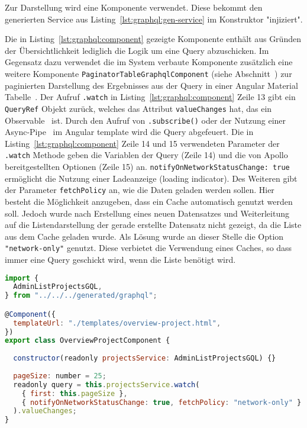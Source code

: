 Zur Darstellung wird eine Komponente verwendet. Diese bekommt den generierten Service aus Listing~\ref{lst:graphql:gen-service} im Konstruktor "injiziert". 

Die in Listing~\ref{lst:graphql:component} gezeigte Komponente enthält aus Gründen der Übersichtlichkeit lediglich die Logik um eine Query abzuschicken. Im Gegensatz dazu verwendet die im System verbaute Komponente zusätzlich eine weitere Komponente \texttt{PaginatorTableGraphql\-Component} (siehe Abschnitt~) zur paginierten Darstellung des Ergebnisses aus der Query in einer Angular Material Tabelle~\cite{angular-material-table}.
Der Aufruf \texttt{.watch} in Listing~\ref{lst:graphql:component} Zeile 13 gibt ein \texttt{QueryRef} Objekt zurück, welches das Attribut \texttt{valueChanges} hat, das ein Observable~\cite{angular-observable} ist.
Durch den Aufruf von \texttt{.subscribe()} \cite{angular-subscribe} oder der Nutzung einer Async-Pipe~\cite{angular-async-pipe} im Angular template wird die Query abgefeuert.
Die in Listing~\ref{lst:graphql:component} Zeile 14 und 15 verwendeten Parameter der \texttt{.watch} Methode geben die Variablen der Query (Zeile 14) und die von Apollo bereitgestellten Optionen (Zeile 15) an.
\texttt{notifyOnNetworkStatusChange: true} ermöglicht die Nutzung einer Ladeanzeige (loading indicator). Des Weiteren gibt der Parameter \texttt{fetchPolicy} an, wie die Daten geladen werden sollen. Hier besteht die Möglichkeit anzugeben, dass ein Cache automatisch genutzt werden soll. Jedoch wurde nach Erstellung eines neuen Datensatzes und Weiterleitung auf die Listendarstellung der gerade erstellte Datensatz nicht gezeigt, da die Liste aus dem Cache geladen wurde. Als Lösung wurde an dieser Stelle die Option \texttt{"network-only"} genutzt. Diese verbietet die Verwendung eines Caches, so dass immer eine Query geschickt wird, wenn die Liste benötigt wird.

\begin{lstlisting}[language=JavaScript,float=h!,caption={Angular Komponente zum Anzeigen der Projekte in Listendarstellung}, label={lst:graphql:component}]
import {
  AdminListProjectsGQL,
} from "../../../generated/graphql";

@Component({
  templateUrl: "./templates/overview-project.html",
})
export class OverviewProjectComponent {  
  
  constructor(readonly projectsService: AdminListProjectsGQL) {}
  
  pageSize: number = 25;
  readonly query = this.projectsService.watch(
    { first: this.pageSize },
    { notifyOnNetworkStatusChange: true, fetchPolicy: "network-only" }
  ).valueChanges;
}
\end{lstlisting}


